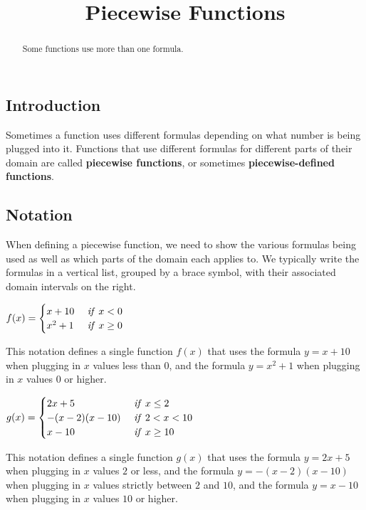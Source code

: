\documentclass{ximera}
\title{Piecewise Functions}
\begin{document}
\begin{abstract}
  Some functions use more than one formula.
\end{abstract}
\maketitle

\subsection*{Introduction}
Sometimes a function uses different formulas depending on what number is being plugged into it. Functions that use different formulas for different parts of their domain are called \textbf{piecewise functions}, or sometimes \textbf{piecewise-defined functions}.

\subsection*{Notation}
When defining a piecewise function, we need to show the various formulas being used as well as which parts of the domain each applies to. We typically write the formulas in a vertical list, grouped by a brace symbol, with their associated domain intervals on the right.

\begin{example}
$f(x)=\begin{cases} x+10 &  \mbox{ \emph{if} } x<0\\x^2+1 &  \mbox{ \emph{if} } x\geq 0\end{cases}$

This notation defines a single function $f(x)$ that uses the formula $y=x+10$ when plugging in $x$ values less than $0$, and the formula $y=x^2+1$ when plugging in $x$ values $0$ or higher.
\end{example}

\begin{example}
$g(x)=\begin{cases} 2x+5 & \mbox{ \emph{if} }x\leq 2\\ -(x-2)(x-10) & \mbox{ \emph{if} } 2<x<10\\ x-10 & \mbox{ \emph{if} } x\geq 10\end{cases}$

This notation defines a single function $g(x)$ that uses the formula $y=2x+5$ when plugging in $x$ values $2$ or less, and the formula $y=-(x-2)(x-10)$ when plugging in $x$ values strictly between $2$ and $10$, and the formula $y=x-10$ when plugging in $x$ values $10$ or higher.
\end{example}
\end{document}

